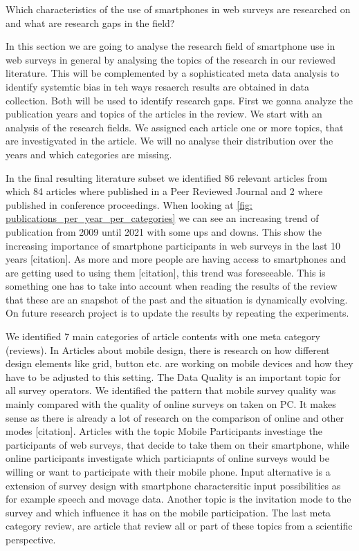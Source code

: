 Which characteristics of the use of smartphones
in web surveys are researched on and what are research gaps in the field?

In this section we are going to analyse the research field of smartphone use in web surveys in general by analysing the topics of the research in our reviewed literature. This will be complemented by a sophisticated meta data analysis to identify systemtic bias in teh ways resaerch results are obtained in data collection. Both will be used to identify research gaps. First we gonna analyze the publication years and topics of the articles in the review.
We start with an analysis of the research fields. We assigned each article one or more topics, that are investigvated in the article. We will no analyse their distribution over the years and which categories are missing.

In the final resulting literature subset we identified 86 relevant articles from which 84 articles where published in a Peer Reviewed Journal and 2 where published in conference proceedings. When looking at \ref{fig: publications_per_year_per_categories} we can see an increasing trend of publication from 2009 until 2021 with some ups and downs. This show the increasing importance of smartphone participants in web surveys in the last 10 years [citation]. As more and more people are having access to smartphones and are getting used to using them [citation], this trend was foreseeable. This is something one has to take into account when reading the results of the review that these are an snapshot of the past and the situation is dynamically evolving. On future research project is to update the results by repeating the experiments.

We identified 7 main categories of article contents with one meta category (reviews). In Articles about mobile design, there is research on how different design elements like grid, button etc. are working on mobile devices and how they have to be adjusted to this setting. The Data Quality is an important topic for all survey operators. We identified the pattern that mobile survey quality was mainly compared with the quality of online surveys on taken on PC. It makes sense as there is already a lot of research on the comparison of online and other modes [citation]. Articles with the topic Mobile Participants investiage the participants of web surveys, that decide to take them on their smartphone, while online participants investigate which particiapnts of online surveys would be willing or want to participate with their mobile phone. Input alternative is a extension of survey design with smartphone charactersitic input possibilities as for example speech and movage data. Another topic is the invitation mode to the survey and which influence it has on the mobile participation. The last meta category review, are article that review all or part of these topics from a scientific perspective. 

